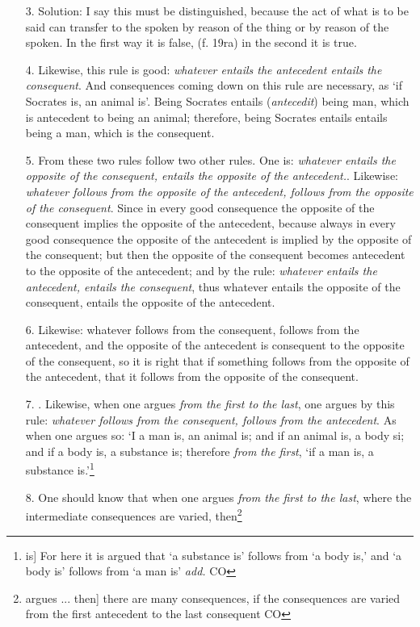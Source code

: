 \documentclass[]{article}
\begin{document}
\begin{itemize}
{Since if the consequent `I say you are an animal' follows from the antecedent `I say you are an ass,' then L.} `to say [something] true' follows from the consequent `I say you are an animal'; therefore `to say [something] true' follows from the antecedent `I say you are an ass', which is the antecedent. This, then, is a true or good consequence: `if I say you are an animal, I say [something] true; therefore, if I say you are an ass, I say something true.' And it is established by this rule: whatever follows from the consequent, follows from the antecedent.
\item[3.] Solution: I say this must be distinguished, because the act of what is to be said can transfer to the spoken by reason of the thing or by reason of the spoken. In the first way it is false, (f. 19ra) in the second it is true.
\item[4.] Likewise, this rule is good: \textit{whatever entails the antecedent entails the consequent}. And consequences coming down on this rule are necessary, as `if Socrates is, an animal is'. Being Socrates entails (\textit{antecedit}) being man, which is antecedent to being an animal; therefore, being Socrates entails entails being a man, which is the consequent.
\item[5.] From these two rules follow two other rules. One is: \textit{whatever entails the opposite of the consequent, entails the opposite of the antecedent.}. Likewise: \textit{whatever follows from the opposite of the antecedent, follows from the opposite of the consequent}. Since in every good consequence the opposite of the consequent implies the opposite of the antecedent, because always in every good consequence the opposite of the antecedent is implied by the opposite of the consequent; but then the opposite of the consequent becomes antecedent to the opposite of the antecedent; and by the rule: \textit{whatever entails the antecedent, entails the consequent}, thus whatever entails the opposite of the consequent, entails the opposite of the antecedent.
\item[6.] Likewise: whatever follows from the consequent, follows from the antecedent, and the opposite of the antecedent is consequent to the opposite of the consequent, so it is right that if something follows from the opposite of the antecedent, that it follows from the opposite of the consequent.
\item[7.]. Likewise, when one argues \textit{from the first to the last}, one argues by this rule: \textit{whatever follows from the consequent, follows from the antecedent}. As when one argues so: `I a man is, an animal is; and if an animal is, a body si; and if a body is, a substance is; therefore \textit{from the first}, `if a man is, a substance is.'\footnote{is] For here it is argued that `a substance is' follows from `a body is,' and `a body is' follows from `a man is' \textit{add.} CO}
\item[8.] One should know that when one argues \textit{from the first to the last}, where the intermediate consequences are varied, then\footnote{argues ... then] there are many consequences, if the consequences are varied from the first antecedent to the last consequent CO
	
}
\end{itemize}
\end{document}

